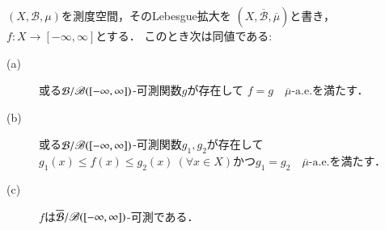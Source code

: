 		\begin{screen}
			\begin{thm}[完備化前後の可測関数の関係]
				$(X,\mathcal{B},\mu)$を測度空間，そのLebesgue拡大を
				$(X,\overline{\mathcal{B}},\overline{\mu})$と書き，
				$f:X \longrightarrow [-\infty,\infty]$とする．
				このとき次は同値である:
				\begin{description}
					\item[(a)] 或る$\mathcal{B}/\mathscr{B}([-\infty,\infty])$-可測関数$g$が存在して
						$f = g\quad \mbox{$\overline{\mu}$-a.e.}$を満たす．
					\item[(b)] 或る$\mathcal{B}/\mathscr{B}([-\infty,\infty])$-可測関数$g_1,g_2$が存在して
						$g_1(x) \leq f(x) \leq g_2(x)\ (\forall x \in X)$かつ$g_1 = g_2\quad \mbox{$\overline{\mu}$-a.e.}$を満たす．
					\item[(c)] $f$は$\overline{\mathcal{B}}/\mathscr{B}([-\infty,\infty])$-可測である．
				\end{description}
			\end{thm}
		\end{screen}
		
